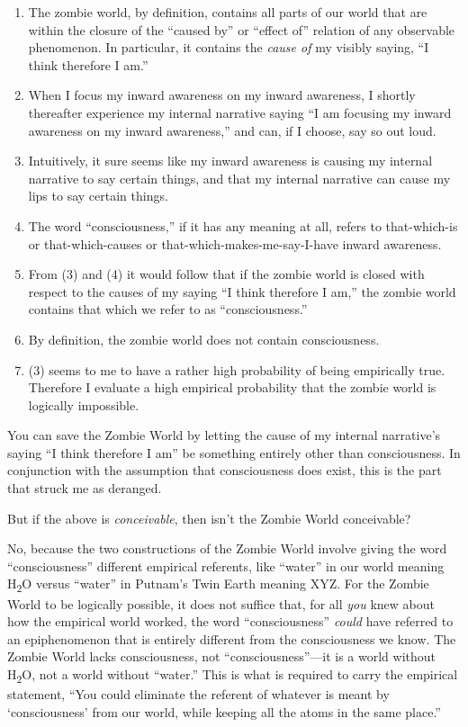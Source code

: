 \begin{enumerate}
\item{
 The zombie world, by definition, contains all parts of our world
that are within the closure of the ``caused
by'' or ``effect
of'' relation of any observable phenomenon. In
particular, it contains the \textit{cause of} my visibly saying,
``I think therefore I am.''}

\item{
 When I focus my inward awareness on my inward awareness, I shortly
thereafter experience my internal narrative saying ``I
am focusing my inward awareness on my inward
awareness,'' and can, if I choose, say so out loud.}

\item{
 Intuitively, it sure seems like my inward awareness is causing my
internal narrative to say certain things, and that my internal
narrative can cause my lips to say certain things.}

\item{
 The word ``consciousness,'' if
it has any meaning at all, refers to that-which-is or that-which-causes
or that-which-makes-me-say-I-have inward awareness.}

\item{
 From (3) and (4) it would follow that if the zombie world is
closed with respect to the causes of my saying ``I
think therefore I am,'' the zombie world contains
that which we refer to as
``consciousness.''}

\item{
 By definition, the zombie world does not contain consciousness.}

\item{
 (3) seems to me to have a rather high probability of being
empirically true. Therefore I evaluate a high empirical probability
that the zombie world is logically impossible.}
\end{enumerate}

{
 You can save the Zombie World by letting the cause of my internal
narrative's saying ``I think therefore
I am'' be something entirely other than
consciousness. In conjunction with the assumption that consciousness
does exist, this is the part that struck me as deranged.}

{
 But if the above is \textit{conceivable}, then
isn't the Zombie World conceivable?}

{
 No, because the two constructions of the Zombie World involve
giving the word ``consciousness''
different empirical referents, like
``water'' in our world meaning
H\textsubscript{2}O versus ``water''
in Putnam's Twin Earth meaning XYZ. For the Zombie
World to be logically possible, it does not suffice that, for all
\textit{you} knew about how the empirical world worked, the word
``consciousness'' \textit{could}
have referred to an epiphenomenon that is entirely different from the
consciousness we know. The Zombie World lacks consciousness, not
``consciousness''---it is a world
without H\textsubscript{2}O, not a world without
``water.'' This is what is required
to carry the empirical statement, ``You could
eliminate the referent of whatever is meant by
`consciousness' from our world, while
keeping all the atoms in the same place.''}

